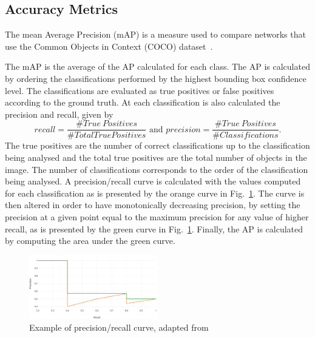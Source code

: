 \subsection{Accuracy Metrics}
\label{sec:map}


The mean Average Precision (mAP) is a measure used to compare networks that use the Common Objects in
Context (COCO) dataset~\cite{coco:Microsoft}.



The mAP is the average of the
AP calculated for each class. The AP is calculated by ordering the
classifications performed by the highest bounding box confidence level. The
classifications are evaluated as true positives or false positives according to the ground truth. At each classification is also calculated the precision and recall, given by
\begin{equation}
	recall = \frac{\#True \ Positives}{\# Total True Positives} \text{ and } precision = \frac{\# True \ Positives}{\# Classifications}.
	\label{eq:precision_recall}
\end{equation}
The true positives are the number of correct classifications up to the classification being analysed and the total true positives are the total number of objects in the image. The number of classifications corresponds to the order of the classification being analysed. A precision/recall curve is calculated with the values computed for each classification as is presented by the orange curve in Fig.~\ref{fig:mAP}. The curve is then altered in order to have monotonically decreasing precision, by setting the precision at a given point equal to the maximum precision for any value of higher recall, as is presented by the green curve in Fig.~\ref{fig:mAP}. Finally, the AP is calculated by computing the area under the green curve.
\begin{figure}[!htb]
	\centering
	\includegraphics[width=0.5\textwidth]{Figures/mAP.png}
	\caption[Caption for figure in TOC.]{Example of precision/recall curve, adapted from~\cite{mAP}}
	\label{fig:mAP}
\end{figure}

